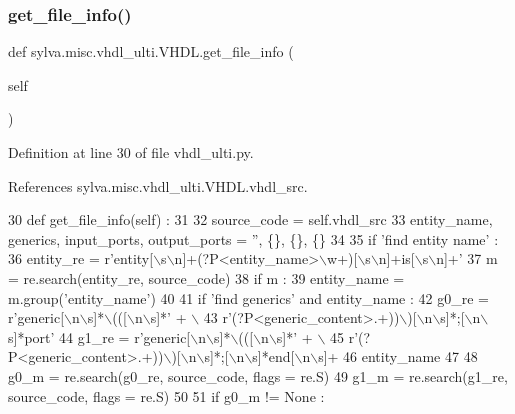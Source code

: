 \subsubsection{\texorpdfstring{get\+\_\+file\+\_\+info()}{get\_file\_info()}}
{\footnotesize\ttfamily def sylva.\+misc.\+vhdl\+\_\+ulti.\+V\+H\+D\+L.\+get\+\_\+file\+\_\+info (\begin{DoxyParamCaption}\item[{}]{self }\end{DoxyParamCaption})}



Definition at line 30 of file vhdl\+\_\+ulti.\+py.



References sylva.\+misc.\+vhdl\+\_\+ulti.\+V\+H\+D\+L.\+vhdl\+\_\+src.


\begin{DoxyCode}
30   \textcolor{keyword}{def }get\_file\_info(self) :
31 
32     source\_code = self.vhdl\_src
33     entity\_name, generics, input\_ports, output\_ports = \textcolor{stringliteral}{''}, \{\}, \{\}, \{\}
34 
35     \textcolor{keywordflow}{if} \textcolor{stringliteral}{'find entity name'} :
36       entity\_re = \textcolor{stringliteral}{r'entity[\(\backslash\)s\(\backslash\)n]+(?P<entity\_name>\(\backslash\)w+)[\(\backslash\)s\(\backslash\)n]+is[\(\backslash\)s\(\backslash\)n]+'}
37       m = re.search(entity\_re, source\_code)
38       \textcolor{keywordflow}{if} m :
39         entity\_name = m.group(\textcolor{stringliteral}{'entity\_name'})
40 
41     \textcolor{keywordflow}{if} \textcolor{stringliteral}{'find generics'} \textcolor{keywordflow}{and} entity\_name :
42       g0\_re = \textcolor{stringliteral}{r'generic[\(\backslash\)n\(\backslash\)s]*\(\backslash\)(([\(\backslash\)n\(\backslash\)s]*'} + \(\backslash\)
43               \textcolor{stringliteral}{r'(?P<generic\_content>.+))\(\backslash\))[\(\backslash\)n\(\backslash\)s]*;[\(\backslash\)n\(\backslash\)s]*port'}
44       g1\_re = \textcolor{stringliteral}{r'generic[\(\backslash\)n\(\backslash\)s]*\(\backslash\)(([\(\backslash\)n\(\backslash\)s]*'} + \(\backslash\)
45               \textcolor{stringliteral}{r'(?P<generic\_content>.+))\(\backslash\))[\(\backslash\)n\(\backslash\)s]*;[\(\backslash\)n\(\backslash\)s]*end[\(\backslash\)n\(\backslash\)s]+%
46                 entity\_name
47 
48       g0\_m = re.search(g0\_re, source\_code, flags = re.S)
49       g1\_m = re.search(g1\_re, source\_code, flags = re.S)
50 
51       \textcolor{keywordflow}{if} g0\_m != \textcolor{keywordtype}{None} :
}
\end{DoxyCode}
